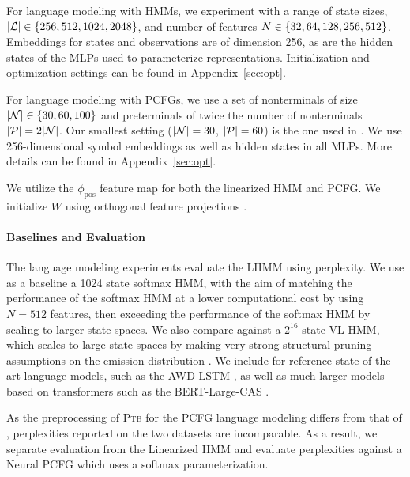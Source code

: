 \documentclass{article}
\begin{document}
For language modeling with HMMs, we experiment with a range of state sizes, $|\mathcal{L}| \in \left\{256,512,1024,2048\right\}$,
and number of features $N \in \left\{32, 64, 128, 256, 512\right\}$.
Embeddings for states and observations are of dimension 256, as are the hidden states of the MLPs used to parameterize representations. Initialization and optimization settings can be found in Appendix~\ref{sec:opt}.

For language modeling with PCFGs, we use a set of nonterminals of size $|\mathcal{N}| \in \left\{30, 60, 100\right\}$ and preterminals of twice the number of nonterminals $|\mathcal{P}|=2|\mathcal{N}|$. Our smallest setting ($|\mathcal{N}|=30$, $|\mathcal{P}|=60$) is the one used in \citet{kim2019cpcfg}.
We use 256-dimensional symbol embeddings as well as hidden states in all MLPs. More details can be found in Appendix~\ref{sec:opt}. 

We utilize the $\phi_{\textrm{pos}}$ feature map for both the linearized HMM and PCFG. We initialize $W$ using orthogonal feature projections \citep{choromanski2020performer}.

\paragraph{Baselines and Evaluation}
The language modeling experiments evaluate the LHMM using perplexity. We use as a baseline a 1024 state softmax HMM, with the aim of matching the performance of the softmax HMM at a lower computational cost by using $N=512$ features, then exceeding the performance of the softmax HMM by scaling to larger state spaces.  We also compare against a $2^{16}$ state VL-HMM, which scales to large state spaces by making very strong structural pruning assumptions on the emission distribution \citep{chiu2020scaling}. We include for reference state of the art language models, such as the AWD-LSTM \citep{merity2017awdlstm}, as well as much larger models based on transformers such as the BERT-Large-CAS \citep{transformerlm}.

As the preprocessing of \textsc{Ptb} for the PCFG language modeling differs from that of \citet{mikolov-2011}, perplexities reported on the two datasets are incomparable. As a result, we separate evaluation from the Linearized HMM and evaluate perplexities against a Neural PCFG \citep{kim2019cpcfg} which uses a softmax parameterization.
\end{document}
